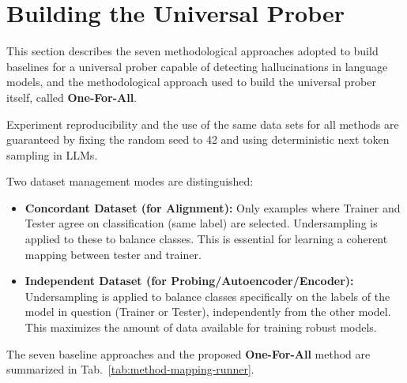\section{Building the Universal Prober}
This section describes the seven methodological approaches adopted to build baselines for a universal prober capable of detecting hallucinations in language models, and the methodological approach used to build the universal prober itself, called \textbf{One-For-All}.

Experiment reproducibility and the use of the same data sets for all methods are guaranteed by fixing the random seed to 42 and using deterministic next token sampling in LLMs.

Two dataset management modes are distinguished:
\begin{itemize}
\item \textbf{Concordant Dataset (for Alignment):} Only examples where Trainer and Tester agree on classification (same label) are selected. Undersampling is applied to these to balance classes. This is essential for learning a coherent mapping between tester and trainer.
\item \textbf{Independent Dataset (for Probing/Autoencoder/Encoder):} Undersampling is applied to balance classes specifically on the labels of the model in question (Trainer or Tester), independently from the other model. This maximizes the amount of data available for training robust models.
\end{itemize}

The seven baseline approaches and the proposed \textbf{One-For-All} method are summarized in Tab.~\ref{tab:method-mapping-runner}.


